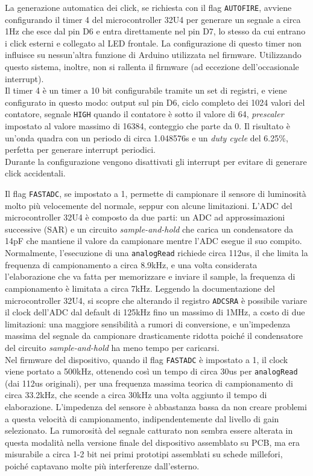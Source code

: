 La generazione automatica dei click, se richiesta con il flag \texttt{AUTOFIRE}, avviene configurando il timer 4 del microcontroller 32U4 per generare un segnale a circa 1Hz che esce dal pin D6 e entra direttamente nel pin D7, lo stesso da cui entrano i click esterni e collegato al LED frontale. La configurazione di questo timer non influisce su nessun'altra funzione di Arduino utilizzata nel firmware. Utilizzando questo sistema, inoltre, non si rallenta il firmware (ad eccezione dell'occasionale interrupt).\\
Il timer 4 è un timer a 10 bit configurabile tramite un set di registri\cite{atmega32u4_datasheet}, e viene configurato in questo modo: output sul pin D6, ciclo completo dei 1024 valori del contatore, segnale \texttt{HIGH} quando il contatore è sotto il valore di 64, \textit{prescaler} impostato al valore massimo di 16384, conteggio che parte da 0. Il risultato è un'onda quadra con un periodo di circa 1.048576s e un \textit{duty cycle} del 6.25\%, perfetta per generare interrupt periodici.\\
Durante la configurazione vengono disattivati gli interrupt per evitare di generare click accidentali.

Il flag \texttt{FASTADC}, se impostato a 1, permette di campionare il sensore di luminosità molto più velocemente del normale, seppur con alcune limitazioni. L'ADC del microcontroller 32U4 è composto da due parti: un ADC ad approssimazioni successive (SAR) e un circuito \textit{sample-and-hold} che carica un condensatore da 14pF che mantiene il valore da campionare mentre l'ADC esegue il suo compito.\\
Normalmente, l'esecuzione di una \texttt{analogRead} richiede circa 112us, il che limita la frequenza di campionamento a circa 8.9kHz, e una volta considerata l'elaborazione che va fatta per memorizzare e inviare il sample, la frequenza di campionamento è limitata a circa 7kHz. Leggendo la documentazione del microcontroller 32U4, si scopre che alterando il registro \texttt{ADCSRA} è possibile variare il clock dell'ADC dal default di 125kHz fino un massimo di 1MHz\cite{atmega32u4_datasheet}, a costo di due limitazioni: una maggiore sensibilità a rumori di conversione, e un'impedenza massima del segnale da campionare drasticamente ridotta poiché il condensatore del circuito \textit{sample-and-hold} ha meno tempo per caricarsi.\\
Nel firmware del dispositivo, quando il flag \texttt{FASTADC} è impostato a 1, il clock viene portato a 500kHz, ottenendo così un tempo di circa 30us per \texttt{analogRead} (dai 112us originali), per una frequenza massima teorica di campionamento di circa 33.2kHz, che scende a circa 30kHz una volta aggiunto il tempo di elaborazione. L'impedenza del sensore è abbastanza bassa da non creare problemi a questa velocità di campionamento, indipendentemente dal livello di gain selezionato. La rumorosità del segnale catturato non sembra essere alterata in questa modalità nella versione finale del dispositivo assemblato su PCB, ma era misurabile a circa 1-2 bit nei primi prototipi assemblati su schede millefori, poiché captavano molte più interferenze dall'esterno.

